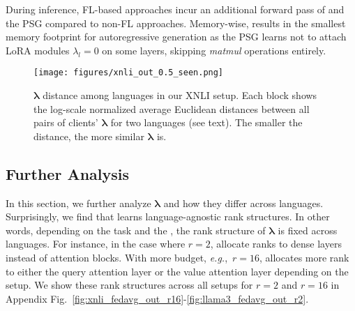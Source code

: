During inference, FL-based approaches incur an additional forward pass of \basemodel{} and the PSG compared to non-FL approaches. Memory-wise, \method{} results in the smallest memory footprint for autoregressive generation as the PSG learns not to attach LoRA modules $\lambda_l=0$ on some layers, skipping {\em matmul} operations entirely.

\begin{figure}[t]
    \vspace{-0.2em}
    \small
    \centering
    \texttt{[image: figures/xnli\_out\_0.5\_seen.png]}
    \vspace{-2em}
    \caption{$\bm{\lambda}$ distance among languages in our XNLI setup. Each block shows the log-scale normalized average Euclidean distances between all pairs of clients' $\bm{\lambda}$ for two languages (see text). The smaller the distance, the more similar $\bm{\lambda}$ is. }
    \label{fig:xnli_out}
    \vspace{-1.5em}
\end{figure}

\subsection{Further Analysis}\label{sec:analysis}

In this section, we further analyze $\bm{\lambda}$ and how they differ across languages. Surprisingly, we find that \method{} learns language-agnostic rank structures. In other words, depending on the task and the \basemodel{}, the rank structure of $\bm{\lambda}$ is fixed across languages. For instance, in the case where $r=2$, \method{} allocate ranks to dense layers instead of attention blocks. With more budget, \textit{e.g.},~$r=16$, \method{} allocates more rank to either the query attention layer or the value attention layer depending on the setup. We show these rank structures across all setups for $r=2$ and $r=16$ in Appendix Fig.~\ref{fig:xnli_fedavg_out_r16}-\ref{fig:llama3_fedavg_out_r2}.

